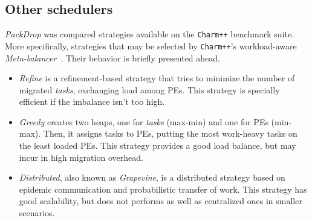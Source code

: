 \subsection{Other schedulers}

\textit{PackDrop} was compared strategies available on the \texttt{Charm++} benchmark suite.
More specifically, strategies that may be selected by \texttt{Charm++}'s workload-aware \textit{Meta-balancer}~\cite{MenonPHD}.
Their behavior is briefly presented ahead.

\begin{itemize}
	\item \textit{Refine} is a refinement-based strategy that tries to minimize the number of migrated \textit{tasks}, exchanging load among PEs.
This strategy is specially efficient if the imbalance isn't too high.
	\item \textit{Greedy} creates two heaps, one for \textit{tasks} (max-min) and one for PEs (min-max). 
Then, it assigns tasks to PEs, putting the most work-heavy tasks on the least loaded PEs.
This strategy provides a good load balance, but may incur in high migration overhead.
    \item \textit{Distributed}, also known as \textit{Grapevine}, is a distributed strategy based on epidemic communication and probabilistic transfer of work.
   This strategy has good scalability, but does not performs as well as centralized ones in smaller scenarios.

\end{itemize}



